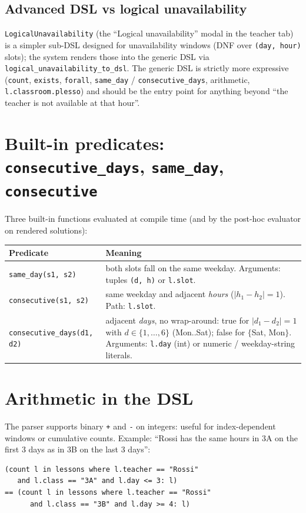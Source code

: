 \subsection{Advanced DSL vs logical unavailability}

\texttt{LogicalUnavailability} (the ``Logical unavailability''
modal in the teacher tab) is a simpler sub-DSL designed for
unavailability windows (DNF over \texttt{(day, hour)} slots);
the system renders those into the generic DSL via
\texttt{logical\_unavailability\_to\_dsl}. The generic DSL is
strictly more expressive (\texttt{count}, \texttt{exists},
\texttt{forall}, \texttt{same\_day} /
\texttt{consecutive\_days}, arithmetic,
\texttt{l.classroom.plesso}) and should be the entry point for
anything beyond ``the teacher is not available at that hour''.

\section{Built-in predicates: \texttt{consecutive\_days},
\texttt{same\_day}, \texttt{consecutive}}
\label{sec:dsl-predicates-ref-en}

Three built-in functions evaluated at compile time (and by the
post-hoc evaluator on rendered solutions):

\begin{tabular}{lp{8cm}}
\toprule
\textbf{Predicate} & \textbf{Meaning} \\
\midrule
\texttt{same\_day(s1, s2)} &
  both slots fall on the same weekday. Arguments: tuples
  \texttt{(d, h)} or \texttt{l.slot}. \\

\texttt{consecutive(s1, s2)} &
  same weekday and adjacent \emph{hours} ($|h_1-h_2|=1$). Path:
  \texttt{l.slot}. \\

\texttt{consecutive\_days(d1, d2)} &
  adjacent \emph{days}, no wrap-around: true for
  $|d_1-d_2|=1$ with $d \in \{1,\dots,6\}$ (Mon..Sat); false
  for $\{$Sat, Mon$\}$. Arguments: \texttt{l.day} (int) or
  numeric / weekday-string literals. \\
\bottomrule
\end{tabular}

\section{Arithmetic in the DSL}
\label{sec:dsl-arithmetic-en}

The parser supports binary \texttt{+} and \texttt{-} on
integers: useful for index-dependent windows or cumulative
counts. Example: ``Rossi has the same hours in 3A on the first
3 days as in 3B on the last 3 days'':
\begin{lstlisting}
(count l in lessons where l.teacher == "Rossi"
   and l.class == "3A" and l.day <= 3: l)
== (count l in lessons where l.teacher == "Rossi"
      and l.class == "3B" and l.day >= 4: l)
\end{lstlisting}

